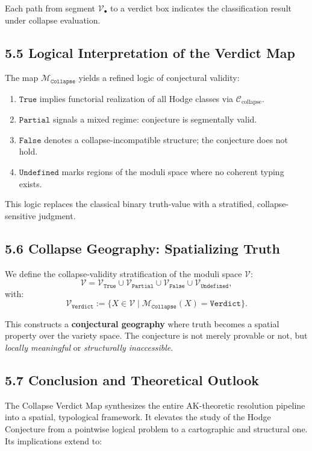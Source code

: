 \documentclass[11pt]{article}
\begin{document}
Each path from segment $\mathcal{V}_\bullet$ to a verdict box indicates the classification result under collapse evaluation.

\subsection{5.5 Logical Interpretation of the Verdict Map}

The map $\mathcal{M}_{\texttt{Collapse}}$ yields a refined logic of conjectural validity:

\begin{enumerate}
  \item $\texttt{True}$ implies functorial realization of all Hodge classes via $\mathcal{C}_{\text{collapse}}$.
  \item $\texttt{Partial}$ signals a mixed regime: conjecture is segmentally valid.
  \item $\texttt{False}$ denotes a collapse-incompatible structure; the conjecture does not hold.
  \item $\texttt{Undefined}$ marks regions of the moduli space where no coherent typing exists.
\end{enumerate}

This logic replaces the classical binary truth-value with a stratified, collapse-sensitive judgment.

\subsection{5.6 Collapse Geography: Spatializing Truth}

We define the collapse-validity stratification of the moduli space $\mathcal{V}$:
\[
\mathcal{V} = \mathcal{V}_{\texttt{True}} \cup \mathcal{V}_{\texttt{Partial}} \cup \mathcal{V}_{\texttt{False}} \cup \mathcal{V}_{\texttt{Undefined}},
\]
with:
\[
\mathcal{V}_{\texttt{Verdict}} := \{ X \in \mathcal{V} \mid \mathcal{M}_{\texttt{Collapse}}(X) = \texttt{Verdict} \}.
\]

This constructs a \textbf{conjectural geography} where truth becomes a spatial property over the variety space. The conjecture is not merely provable or not, but \emph{locally meaningful} or \emph{structurally inaccessible}.

\subsection{5.7 Conclusion and Theoretical Outlook}

The Collapse Verdict Map synthesizes the entire AK-theoretic resolution pipeline into a spatial, typological framework. It elevates the study of the Hodge Conjecture from a pointwise logical problem to a cartographic and structural one. Its implications extend to:
\end{document}
